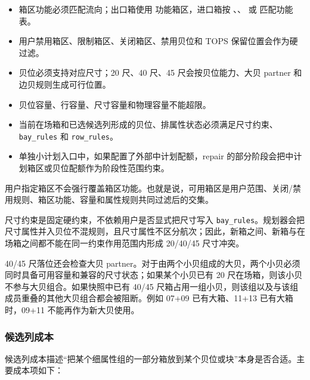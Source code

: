 \documentclass[UTF8,fontset=windows,zihao=-4]{ctexart}
\newcommand{\param}[1]{\nolinkurl{#1}}
\newcommand{\flow}[1]{\texttt{\detokenize{#1}}}
\begin{document}
\begin{itemize}
  \item 箱区功能必须匹配流向；出口箱使用 \flow{OF} 功能箱区，进口箱按 \flow{IZ}、\flow{IF}、\flow{T} 或 \flow{OZ} 匹配功能表。
  \item 用户禁用箱区、限制箱区、关闭箱区、禁用贝位和 TOPS 保留位置会作为硬过滤。
  \item 贝位必须支持对应尺寸；20 尺、40 尺、45 尺会按贝位能力、大贝 partner 和边贝规则生成可行位置。
  \item 贝位容量、行容量、尺寸容量和物理容量不能超限。
  \item 当前在场箱和已选候选列形成的贝位、排属性状态必须满足尺寸约束、\param{bay_rules} 和 \param{row_rules}。
  \item 单独小计划入口中，如果配置了外部中计划配额，repair 的部分阶段会把中计划箱区或贝位配额作为阶段性范围约束。
\end{itemize}

用户指定箱区不会强行覆盖箱区功能。也就是说，可用箱区是用户范围、关闭/禁用规则、箱区功能、容量和属性规则共同过滤后的交集。

尺寸约束是固定硬约束，不依赖用户是否显式把尺寸写入 \param{bay_rules}。规划器会把尺寸属性并入贝位不混规则，且尺寸属性不区分航次；因此，新箱之间、新箱与在场箱之间都不能在同一约束作用范围内形成 20/40/45 尺寸冲突。

40/45 尺落位还会检查大贝 partner。对于由两个小贝组成的大贝，两个小贝必须同时具备可用容量和兼容的尺寸状态；如果某个小贝已有 20 尺在场箱，则该小贝不参与大贝组合。如果快照中已有 40/45 尺箱占用一组小贝，则该组以及与该组成员重叠的其他大贝组合都会被阻断。例如 07+09 已有大箱、11+13 已有大箱时，09+11 不能再作为新大贝使用。

\subsubsection{候选列成本}

候选列成本描述“把某个细属性组的一部分箱放到某个贝位或块”本身是否合适。主要成本项如下：
\end{document}
